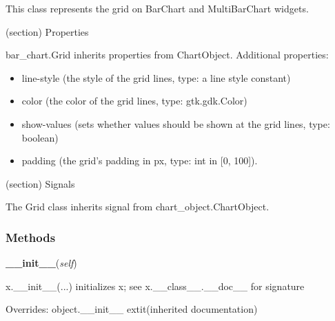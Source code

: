 This class represents the grid on BarChart and MultiBarChart widgets.

(section) Properties

  bar\_chart.Grid inherits properties from ChartObject. Additional 
  properties:

  \begin{itemize}
  \setlength{\parskip}{0.6ex}
    \item line-style (the style of the grid lines, type: a line style constant)

    \item color (the color of the grid lines, type: gtk.gdk.Color)

    \item show-values (sets whether values should be shown at the grid lines, 
      type: boolean)

    \item padding (the grid's padding in px, type: int in [0, 100]).

  \end{itemize}

(section) Signals

  The Grid class inherits signal from chart\_object.ChartObject.



  \subsubsection{Methods}

    \vspace{0.5ex}

\hspace{.8\funcindent}\begin{boxedminipage}{\funcwidth}

    \raggedright \textbf{\_\_init\_\_}(\textit{self})

\setlength{\parskip}{2ex}
    x.\_\_init\_\_(...) initializes x; see x.\_\_class\_\_.\_\_doc\_\_ for 
    signature

\setlength{\parskip}{1ex}
      Overrides: object.\_\_init\_\_ 	extit{(inherited documentation)}

    \end{boxedminipage}

    \vspace{0.5ex}

